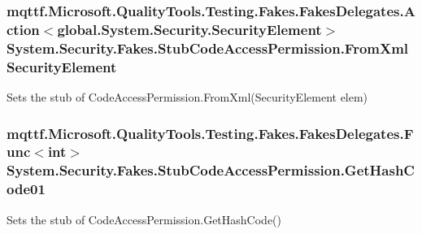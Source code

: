 \hypertarget{class_system_1_1_security_1_1_fakes_1_1_stub_code_access_permission_a48cf3bfdb95f260bc437edc56224cebc}{
\subsubsection[{From\-Xml\-Security\-Element}]{\setlength{\rightskip}{0pt plus 5cm}mqttf.\-Microsoft.\-Quality\-Tools.\-Testing.\-Fakes.\-Fakes\-Delegates.\-Action$<$global.\-System.\-Security.\-Security\-Element$>$ System.\-Security.\-Fakes.\-Stub\-Code\-Access\-Permission.\-From\-Xml\-Security\-Element}}\label{class_system_1_1_security_1_1_fakes_1_1_stub_code_access_permission_a48cf3bfdb95f260bc437edc56224cebc}


Sets the stub of Code\-Access\-Permission.\-From\-Xml(\-Security\-Element elem)

\hypertarget{class_system_1_1_security_1_1_fakes_1_1_stub_code_access_permission_a8cd3ef7916ff1e9f2dae0a0a2686016c}{
\subsubsection[{Get\-Hash\-Code01}]{\setlength{\rightskip}{0pt plus 5cm}mqttf.\-Microsoft.\-Quality\-Tools.\-Testing.\-Fakes.\-Fakes\-Delegates.\-Func$<$int$>$ System.\-Security.\-Fakes.\-Stub\-Code\-Access\-Permission.\-Get\-Hash\-Code01}}\label{class_system_1_1_security_1_1_fakes_1_1_stub_code_access_permission_a8cd3ef7916ff1e9f2dae0a0a2686016c}


Sets the stub of Code\-Access\-Permission.\-Get\-Hash\-Code()

